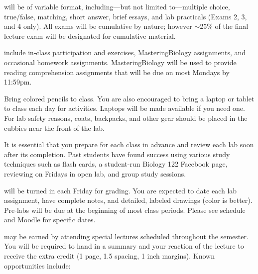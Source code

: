 \documentclass{tufte-handout}
\begin{document}
\begin{fullwidth}




 will be of variable format, including---but not limited to---multiple choice, true/false, matching, short answer, brief essays, and lab practicals (Exams 2, 3, and 4 only). All exams will be cumulative by nature; however $\sim$25\% of the final lecture exam will be designated for cumulative material. 

 include in-class participation and exercises, MasteringBiology assignments, and occasional homework assignments. MasteringBiology will be used to provide reading comprehension assignments that will be due on most Mondays by 11:59pm. 

Bring colored pencils to class. You are also encouraged to bring a laptop or tablet to class each day for activities. Laptops will be made available if you need one. For lab safety reasons, coats, backpacks, and other gear should be placed in the cubbies near the front of the lab. 

It is essential that you prepare for each class in advance and review each lab soon after its completion. Past students have found success using various study techniques such as flash cards, a student-run Biology 122 Facebook page, reviewing on Fridays in open lab, and group study sessions. 

 will be turned in each Friday for grading. You are expected to date each lab assignment, have complete notes, and detailed, labeled drawings (color is better).  {Pre-labs} will be due at the beginning of most class periods. Please see schedule and Moodle for specific dates.

 may be earned by attending special lectures scheduled throughout the semester.  You will be required to hand in a summary and your reaction of the lecture to receive the extra credit (1 page, 1.5 spacing, 1 inch margins). Known opportunities include:


\end{fullwidth}
\end{document}
